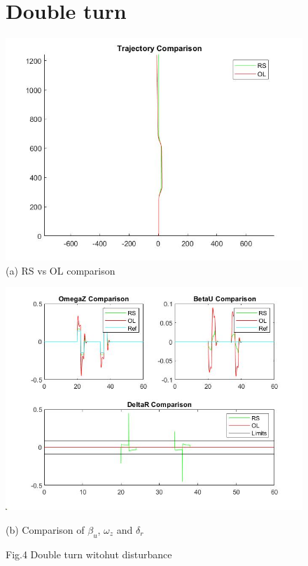\begin{figure}[!h]
\section{Double turn}
		\centering
	        \includegraphics[scale=0.35]{./Images/LaneChange/t} 
                \caption{(a)  RS vs OL comparison}
             
	\end{figure}

\begin{figure}[!h]
		\centering
	        \includegraphics[scale=0.55]{./Images/LaneChange/s} 
                \caption{(b) Comparison of $\beta_{u}$, $\omega_{z}$ and $\delta_{r}$}
                \caption {Fig.4 Double turn witohut disturbance}
             
	\end{figure}

